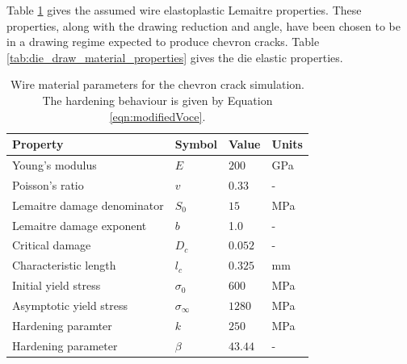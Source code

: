 \documentclass[sn-mathphys,Numbered]{sn-jnl}%
\begin{document}
Table \ref{tab:chevron_mat} gives the assumed wire elastoplastic Lemaitre properties.
These properties, along with the drawing reduction and angle, have been chosen to be in a drawing regime expected to produce chevron cracks.
Table \ref{tab:die_draw_material_properties} gives the die elastic properties.
\begin{table}[htb]
	\centering
		\begin{tabular}{llll} \hline
			Property & Symbol & Value & Units  \\ \hline 
			Young's modulus & $E$ & $200$ & GPa \\
			Poisson's ratio & $v$ & $0.33$  &  - \\
			Lemaitre damage denominator & $S_0$ & $15$ & MPa  \\
			Lemaitre damage exponent & $b$ & 1.0 & - \\
			Critical damage & $D_c$ & $0.052$ & -\\
			Characteristic length & $l_c$ & $0.325$ & mm  \\
			Initial yield stress & $\sigma_0$ & $600$ & MPa  \\
			Asymptotic yield stress & $\sigma_\infty$ & $1280$ & MPa  \\
			Hardening paramter & $k$ & $250$ & MPa  \\
			Hardening parameter & $\beta$ & $43.44$ & -  \\
			\hline
		\end{tabular}
	\caption{Wire material parameters for the chevron crack simulation. The hardening behaviour is given by Equation \ref{eqn:modifiedVoce}.}
	\label{tab:chevron_mat}
\end{table}
\end{document}
